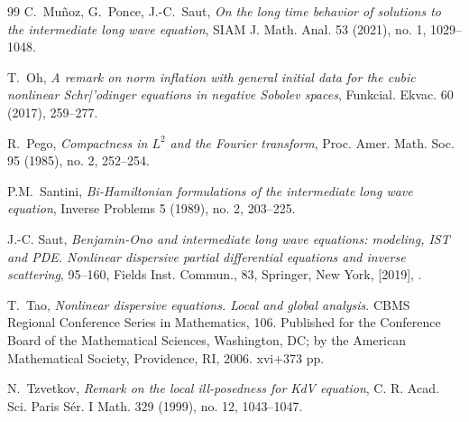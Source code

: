 \documentclass[letterpaper, 11pt,  reqno]{amsart}
\newcommand{\1}{\hspace{0.5mm}\textup{I}\hspace{0.5mm}}
\numberwithin{equation}{section}
\numberwithin{theorem}{section}
\begin{document}
\begin{thebibliography}{99}
C.~Mu\~noz, G.~Ponce, J.-C.~Saut,
{\it On the long time behavior of solutions to the intermediate long wave equation},
SIAM J. Math. Anal. 53 (2021), no. 1, 1029--1048.



T.~Oh, 
{\it A remark on norm inflation with general initial data for the cubic nonlinear Schr|'odinger equations in negative Sobolev spaces}, Funkcial. Ekvac. 60 (2017), 259--277. 


R.~Pego, 
{\it Compactness in $L^2$ and the Fourier transform},
Proc. Amer. Math. Soc. 95 (1985), no. 2, 252--254.



P.M.~Santini,
{\it Bi-Hamiltonian formulations of the intermediate long wave equation},
Inverse Problems 5 (1989), no. 2, 203--225.



	
J.-C. Saut,
 {\it Benjamin-Ono and intermediate long wave equations: modeling, IST and PDE. Nonlinear
dispersive partial differential equations and inverse scattering}, 
95--160, Fields Inst. Commun., 83, Springer, New York, [2019], .






%
%
%
%
T.~Tao, 
{\it  Nonlinear dispersive equations. Local and global analysis}. CBMS Regional Conference Series in
Mathematics, 106. Published for the Conference Board of the Mathematical Sciences, Washington, DC;
by the American Mathematical Society, Providence, RI, 2006. xvi+373 pp.



N.~Tzvetkov, 
{\it Remark on the local ill-posedness for KdV equation}, C. R. Acad. Sci. Paris S\'er. I Math. 329 (1999), no. 12, 1043--1047.



	
	
	

	

	
	
\end{thebibliography}
\end{document}
